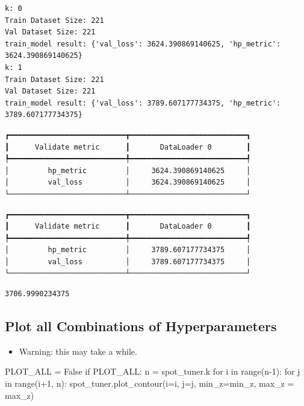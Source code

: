 \documentclass[
  letterpaper,
  DIV=11,
  numbers=noendperiod]{scrreprt}
\newenvironment{Shaded}{\begin{snugshade}}{\end{snugshade}}
\newcommand{\BuiltInTok}[1]{\textcolor[rgb]{0.00,0.23,0.31}{#1}}
\newcommand{\ControlFlowTok}[1]{\textcolor[rgb]{0.00,0.23,0.31}{#1}}
\newcommand{\DecValTok}[1]{\textcolor[rgb]{0.68,0.00,0.00}{#1}}
\newcommand{\KeywordTok}[1]{\textcolor[rgb]{0.00,0.23,0.31}{#1}}
\newcommand{\NormalTok}[1]{\textcolor[rgb]{0.00,0.23,0.31}{#1}}
\newcommand{\OperatorTok}[1]{\textcolor[rgb]{0.37,0.37,0.37}{#1}}
\newcommand{\VariableTok}[1]{\textcolor[rgb]{0.07,0.07,0.07}{#1}}
\providecommand{\tightlist}{%
  \setlength{\itemsep}{0pt}\setlength{\parskip}{0pt}}\usepackage{longtable,booktabs,array}
\begin{document}
\begin{verbatim}
k: 0
Train Dataset Size: 221
Val Dataset Size: 221
train_model result: {'val_loss': 3624.390869140625, 'hp_metric': 3624.390869140625}
k: 1
Train Dataset Size: 221
Val Dataset Size: 221
train_model result: {'val_loss': 3789.607177734375, 'hp_metric': 3789.607177734375}
\end{verbatim}

\begin{verbatim}
┏━━━━━━━━━━━━━━━━━━━━━━━━━━━┳━━━━━━━━━━━━━━━━━━━━━━━━━━━┓
┃      Validate metric      ┃       DataLoader 0        ┃
┡━━━━━━━━━━━━━━━━━━━━━━━━━━━╇━━━━━━━━━━━━━━━━━━━━━━━━━━━┩
│         hp_metric         │     3624.390869140625     │
│         val_loss          │     3624.390869140625     │
└───────────────────────────┴───────────────────────────┘
\end{verbatim}

\begin{verbatim}
┏━━━━━━━━━━━━━━━━━━━━━━━━━━━┳━━━━━━━━━━━━━━━━━━━━━━━━━━━┓
┃      Validate metric      ┃       DataLoader 0        ┃
┡━━━━━━━━━━━━━━━━━━━━━━━━━━━╇━━━━━━━━━━━━━━━━━━━━━━━━━━━┩
│         hp_metric         │     3789.607177734375     │
│         val_loss          │     3789.607177734375     │
└───────────────────────────┴───────────────────────────┘
\end{verbatim}

\begin{verbatim}
3706.9990234375
\end{verbatim}

\subsection{Plot all Combinations of
Hyperparameters}\label{plot-all-combinations-of-hyperparameters-1}

\begin{itemize}
\tightlist
\item
  Warning: this may take a while.
\end{itemize}

\begin{Shaded}
\begin{Highlighting}[]
\NormalTok{PLOT\_ALL }\OperatorTok{=} \VariableTok{False}
\ControlFlowTok{if}\NormalTok{ PLOT\_ALL:}
\NormalTok{    n }\OperatorTok{=}\NormalTok{ spot\_tuner.k}
    \ControlFlowTok{for}\NormalTok{ i }\KeywordTok{in} \BuiltInTok{range}\NormalTok{(n}\OperatorTok{{-}}\DecValTok{1}\NormalTok{):}
        \ControlFlowTok{for}\NormalTok{ j }\KeywordTok{in} \BuiltInTok{range}\NormalTok{(i}\OperatorTok{+}\DecValTok{1}\NormalTok{, n):}
\NormalTok{            spot\_tuner.plot\_contour(i}\OperatorTok{=}\NormalTok{i, j}\OperatorTok{=}\NormalTok{j, min\_z}\OperatorTok{=}\NormalTok{min\_z, max\_z }\OperatorTok{=}\NormalTok{ max\_z)}
\end{Highlighting}
\end{Shaded}
\end{document}

